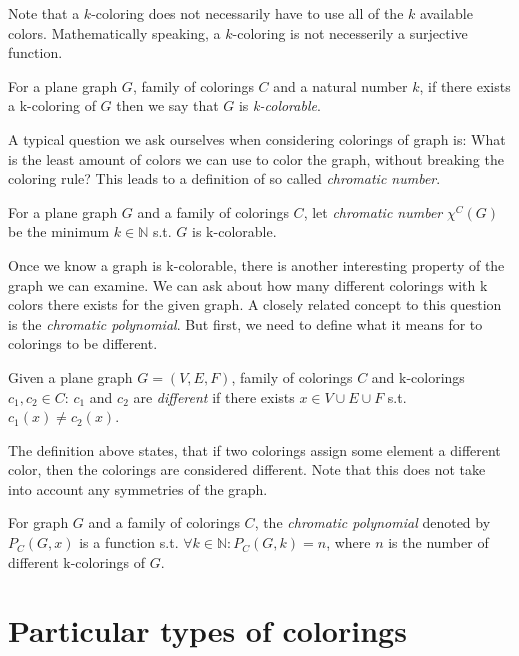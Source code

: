 Note that a $k$-coloring does not necessarily have to use all of the $k$ available colors. Mathematically speaking, a $k$-coloring is not necesserily a surjective function.

\begin{definition}
    For a plane graph $G$, family of colorings $C$ and a natural number $k$, if there exists a k-coloring of $G$ then we say that $G$ is \emph{k-colorable}.
\end{definition}

A typical question we ask ourselves when considering colorings of graph is: What is the least amount of colors we can use to color the graph, without breaking the coloring rule? This leads to a definition of so called \textit{chromatic number}. 


\begin{definition}
    For a plane graph $G$ and a family of colorings $C$, let \emph{chromatic number} $\chi ^C (G)$ be the minimum $k \in \mathbb{N}$ s.t. $G$ is k-colorable.
\end{definition}

Once we know a graph is k-colorable, there is another interesting property of the graph we can examine. We can ask about how many different colorings with k colors there exists for the given graph. A closely related concept to this question is the \emph{chromatic polynomial}. But first, we need to define what it means for to colorings to be different.

\begin{definition}
    Given a plane graph $G=(V,E,F)$, family of colorings $C$ and k-colorings $c_1,c_2 \in C$: $c_1$ and $c_2$ are \emph{different} if there exists $x \in V \cup E \cup F$ s.t. $c_1(x) \neq c_2(x)$.
\end{definition}

The definition above states, that if two colorings assign some element a different color, then the colorings are considered different. Note that this does not take into account any symmetries of the graph.

\begin{definition}
    For graph $G$ and a family of colorings $C$, the \emph{chromatic polynomial} denoted by $P_{C}(G,x)$ is a function s.t. $\forall k \in \mathbb{N} : P_C(G,k) = n$, where $n$ is the number of different k-colorings of $G$.
\end{definition}

\section{Particular types of colorings}

